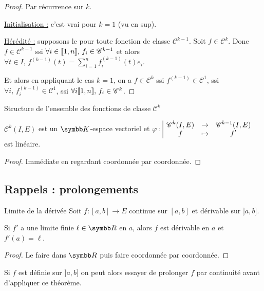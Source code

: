 
\begin{proof}
    Par récurrence sur $k$. 

    \uline{Initialisation :} c'est vrai pour $k = 1$ (vu en sup).

    \uline{Hérédité :} supposons le pour toute fonction de classe $\mathscr C^{k - 1} $. Soit 
    $f \in \mathscr C^k$. Donc $f \in \mathscr C^{k-1}$ ssi $\forall i \in [\![1, n]\!], \, f_i \in \mathscr C^{k-1}$ 
    et alors $\displaystyle \forall t \in I, \, f^{(k-1)}(t) = \sum_{i=1}^n f_i^{(k-1)}(t)e_i$.

    Et alors en appliquant le cas $k = 1$, on a $f \in \mathscr C^k$ ssi $f^{(k-1)} \in \mathscr C^1$, 
    ssi $\forall i, \, f_i^{(k-1)} \in \mathscr C^1$, ssi $\forall i [\![1, n]\!], \, f_i \in \mathscr C^k$.
\end{proof}

\begin{proposition}{Structure de l'ensemble des fonctions de classe $\mathscr C^k$}{}

    $\mathscr C^k(I, E)$ est un $\K$-espace vectoriel et
    $\varphi: \space \begin{array}{|ccc} \displaystyle \mathscr C^k(I, E) & \to & \displaystyle \mathscr C^{k-1}(I, E) \\ \displaystyle f & \mapsto & \displaystyle f' \end{array}$ est linéaire.
\end{proposition}

\begin{proof}
    Immédiate en regardant coordonnée par coordonnée.
\end{proof}

\subsection{Rappels : prolongements}

\begin{theoreme}{Limite de la dérivée}{}
    Soit $f : [a, b] \to E$ continue sur $[a, b]$ et dérivable sur $]a, b]$. 

    Si $f'$ a une limite finie $\ell \in \R$ en $a$, alors $f$ est dérivable en $a$ et $f'(a) = \ell$.
\end{theoreme}

\begin{proof}
    Le faire dans $\R$ puis faire coordonnée par coordonnée.
\end{proof}

\begin{remarque}
    Si $f$ est définie sur $]a,b]$ on peut alors essayer de prolonger $f$ par continuité avant d'appliquer ce théorème.
\end{remarque}


